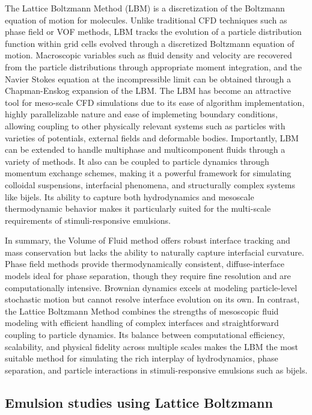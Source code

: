 The Lattice Boltzmann Method (LBM) is a discretization of the Boltzmann equation of motion for molecules. \cite{qian_lattice_1992, succi_lattice_2018, shan_multicomponent_1995, swift_lattice_1996}
Unlike traditional CFD techniques such as phase field or VOF methods, LBM tracks the evolution of a 
particle distribution function within grid cells evolved through a discretized Boltzmann equation of motion. Macroscopic variables such as fluid density and 
velocity are recovered from the particle distributions through appropriate moment integration, and the Navier Stokes equation at the incompressible limit can be 
obtained through a Chapman-Enskog expansion of the LBM. \cite{qian_lattice_1992} The LBM has become an attractive tool for meso-scale CFD simulations due to its ease of algorithm 
implementation, highly parallelizable nature and ease of implemeting boundary conditions, allowing coupling to other physically relevant systems such as 
particles with varieties of potentials, external fields and deformable bodies. Importantly, LBM can be extended to handle multiphase and multicomponent fluids through a variety of methods.
It also can be coupled to particle dynamics through momentum exchange schemes, making it a powerful framework for 
simulating colloidal suspensions, interfacial phenomena, and structurally complex systems like bijels. Its ability to capture both hydrodynamics and mesoscale thermodynamic 
behavior makes it particularly suited for the multi-scale requirements of stimuli-responsive emulsions.

In summary, the Volume of Fluid method offers robust interface tracking and mass conservation but lacks the ability to naturally capture interfacial curvature. 
Phase field methods provide thermodynamically consistent, diffuse-interface models ideal for phase separation, though they require fine resolution and are computationally intensive. 
Brownian dynamics excels at modeling particle-level stochastic motion but cannot resolve interface evolution on its own. In contrast, the Lattice Boltzmann Method 
combines the strengths of mesoscopic fluid modeling with efficient handling of complex interfaces and straightforward coupling to particle dynamics. Its balance between computational 
efficiency, scalability, and physical fidelity across multiple scales makes the LBM the most suitable method for simulating the rich interplay of hydrodynamics, phase separation, and particle 
interactions in stimuli-responsive emulsions such as bijels.

\subsection{Emulsion studies using Lattice Boltzmann}


